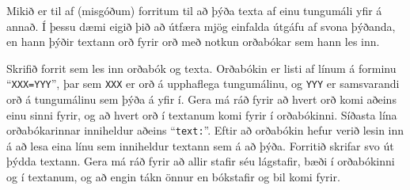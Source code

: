\begin{problem}
	Mikið er til af (misgóðum) forritum til að þýða texta af einu tungumáli yfir á annað. Í þessu dæmi eigið þið að útfæra mjög einfalda útgáfu af svona þýðanda, en hann þýðir textann orð fyrir orð með notkun orðabókar sem hann les inn.

	Skrifið forrit sem les inn orðabók og texta. Orðabókin er listi af línum á forminu "`\texttt{XXX=YYY}"', þar sem \texttt{XXX} er orð á upphaflega tungumálinu, og \texttt{YYY} er samsvarandi orð á tungumálinu sem þýða á yfir í. Gera má ráð fyrir að hvert orð komi aðeins einu sinni fyrir, og að hvert orð í textanum komi fyrir í orðabókinni. Síðasta lína orðabókarinnar inniheldur aðeins "`\texttt{text:}"'. Eftir að orðabókin hefur verið lesin inn á að lesa eina línu sem inniheldur textann sem á að þýða. Forritið skrifar svo út þýdda textann. Gera má ráð fyrir að allir stafir séu lágstafir, bæði í orðabókinni og í textanum, og að engin tákn önnur en bókstafir og bil komi fyrir.

\begin{example}
%
\end{example}
\begin{example}
%
\end{example}

\begin{example}
%
\end{example}
\end{problem}